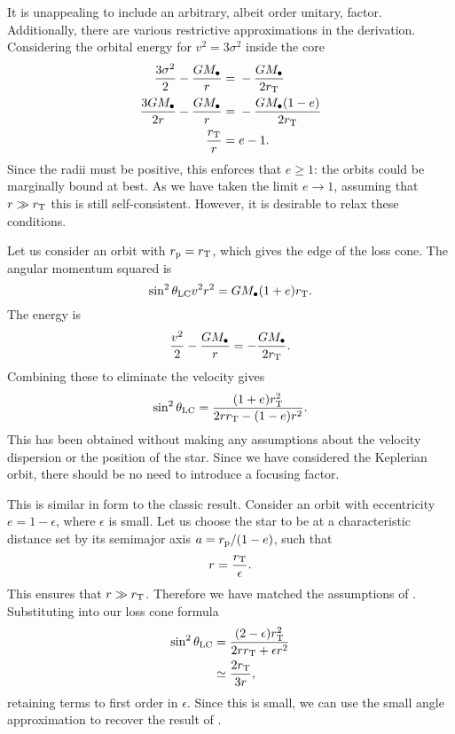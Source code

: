 It is unappealing to include an arbitrary, albeit order unitary, factor. Additionally, there are various restrictive approximations in the derivation. Considering the orbital energy for $v^2 = 3\sigma^2$ inside the core
\begin{align}
\frac{3\sigma^2}{2} - \frac{GM_\bullet}{r} = {} & -\frac{GM_\bullet}{2r_\mathrm{T}} \\
\frac{3GM_\bullet}{2r} - \frac{GM_\bullet}{r} = {} & -\frac{GM_\bullet(1-e)}{2r_\mathrm{T}} \\
\frac{r_\mathrm{T}}{r} = {} & e - 1.
\end{align}
Since the radii must be positive, this enforces that $e \geq 1$: the orbits could be marginally bound at best. As we have taken the limit $e \rightarrow 1$, assuming that $r \gg r_\mathrm{T}$ this is still self-consistent. However, it is desirable to relax these conditions.

Let us consider an orbit with $r_\mathrm{p} = r_\mathrm{T}$, which gives the edge of the loss cone. The angular momentum squared is
\begin{equation}
\sin^2\theta_\mathrm{LC}v^2r^2 = GM_\bullet(1+e)r_\mathrm{T}.
\end{equation}
The energy is
\begin{equation}
\frac{v^2}{2} - \frac{GM_\bullet}{r} = -\frac{GM_\bullet}{2r_\mathrm{T}}.
\end{equation}
Combining these to eliminate the velocity gives
\begin{equation}
\sin^2\theta_\mathrm{LC} = \frac{(1+e)r_\mathrm{T}^2}{2rr_\mathrm{T} - (1-e)r^2}.
\end{equation}
This has been obtained without making any assumptions about the velocity dispersion or the position of the star. Since we have considered the Keplerian orbit, there should be no need to introduce a focusing factor.

This is similar in form to the classic result. Consider an orbit with eccentricity $e = 1 - \epsilon$, where $\epsilon$ is small. Let us choose the star to be at a characteristic distance set by its semimajor axis $a = r_\mathrm{p}/(1 - e)$, such that
\begin{equation}
r = \frac{r_\mathrm{T}}{\epsilon}.
\end{equation}
This ensures that $r \gg r_\mathrm{T}$. Therefore we have matched the assumptions of \citet{Frank1976}. Substituting into our loss cone formula
\begin{align}
\sin^2\theta_\mathrm{LC} = {} & \frac{(2 - \epsilon)r_\mathrm{T}^2}{2rr_\mathrm{T} + \epsilon r^2} \nonumber \\
 \simeq {} & \frac{2r_\mathrm{T}}{3r},
\end{align}
retaining terms to first order in $\epsilon$. Since this is small, we can use the small angle approximation to recover the result of .
